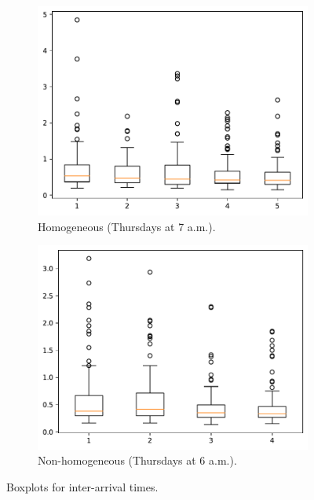     \begin{figure}[H]
        \centering
        \begin{subfigure}[b]{0.475\textwidth}
            \centering
            \includegraphics[scale=0.5]{files/homogeneity-test-for-thursday-hour-7.pdf}
            \caption{Homogeneous (Thursdays at 7 a.m.).}
            \label{subfig:boxplot}
        \end{subfigure}
        \begin{subfigure}[b]{0.475\textwidth}   
            \centering 
            \includegraphics[scale=0.5]{files/homogeneity-test-for-tuesday-hour-6.pdf}
            \caption{Non-homogeneous (Thursdays at 6 a.m.).}
            \label{subfig:dist}
        \end{subfigure}
        \caption{Boxplots for inter-arrival times.}
        \label{fig:homogeneity_boxplots}
	\end{figure}
	
